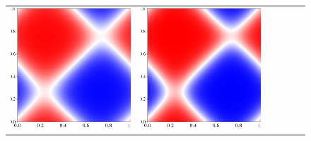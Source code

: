 \documentclass[12pt, reqno]{report}
\theoremstyle{definition}
\theoremstyle{remark}
\begin{document}
\begin{figure}[H]
\begin{tabular}{rccccc}
        \includegraphics[align = c, height=\subheight]{media_paper/AC_cmap_FD_n=200.png} & 
        \includegraphics[align = c, height=\subheight]{media_paper/AC_cmap_FD_n=500.png} & 

\end{tabular}
\end{figure}
\end{document}
